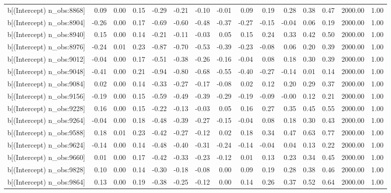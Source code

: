 \begin{table}[ht]
\begin{tabular}{rrrrrrrrrrrrrrr}
  b[(Intercept) n\_obs:8868] & 0.09 & 0.00 & 0.15 & -0.29 & -0.21 & -0.10 & -0.01 & 0.09 & 0.19 & 0.28 & 0.38 & 0.47 & 2000.00 & 1.00 \\ 
  b[(Intercept) n\_obs:8904] & -0.26 & 0.00 & 0.17 & -0.69 & -0.60 & -0.48 & -0.37 & -0.27 & -0.15 & -0.04 & 0.06 & 0.19 & 2000.00 & 1.00 \\ 
  b[(Intercept) n\_obs:8940] & 0.15 & 0.00 & 0.14 & -0.21 & -0.11 & -0.03 & 0.05 & 0.15 & 0.24 & 0.33 & 0.42 & 0.50 & 2000.00 & 1.00 \\ 
  b[(Intercept) n\_obs:8976] & -0.24 & 0.01 & 0.23 & -0.87 & -0.70 & -0.53 & -0.39 & -0.23 & -0.08 & 0.06 & 0.20 & 0.39 & 2000.00 & 1.00 \\ 
  b[(Intercept) n\_obs:9012] & -0.04 & 0.00 & 0.17 & -0.51 & -0.38 & -0.26 & -0.16 & -0.04 & 0.08 & 0.18 & 0.30 & 0.39 & 2000.00 & 1.00 \\ 
  b[(Intercept) n\_obs:9048] & -0.41 & 0.00 & 0.21 & -0.94 & -0.80 & -0.68 & -0.55 & -0.40 & -0.27 & -0.14 & 0.01 & 0.14 & 2000.00 & 1.00 \\ 
  b[(Intercept) n\_obs:9084] & 0.02 & 0.00 & 0.14 & -0.33 & -0.27 & -0.17 & -0.08 & 0.02 & 0.12 & 0.20 & 0.29 & 0.37 & 2000.00 & 1.00 \\ 
  b[(Intercept) n\_obs:9156] & -0.19 & 0.00 & 0.15 & -0.59 & -0.49 & -0.39 & -0.29 & -0.19 & -0.09 & -0.00 & 0.12 & 0.21 & 2000.00 & 1.00 \\ 
  b[(Intercept) n\_obs:9228] & 0.16 & 0.00 & 0.15 & -0.22 & -0.13 & -0.03 & 0.05 & 0.16 & 0.27 & 0.35 & 0.45 & 0.55 & 2000.00 & 1.00 \\ 
  b[(Intercept) n\_obs:9264] & -0.04 & 0.00 & 0.18 & -0.48 & -0.39 & -0.27 & -0.15 & -0.04 & 0.08 & 0.18 & 0.30 & 0.43 & 2000.00 & 1.00 \\ 
  b[(Intercept) n\_obs:9588] & 0.18 & 0.01 & 0.23 & -0.42 & -0.27 & -0.12 & 0.02 & 0.18 & 0.34 & 0.47 & 0.63 & 0.77 & 2000.00 & 1.00 \\ 
  b[(Intercept) n\_obs:9624] & -0.14 & 0.00 & 0.14 & -0.48 & -0.40 & -0.31 & -0.24 & -0.14 & -0.04 & 0.04 & 0.13 & 0.22 & 2000.00 & 1.00 \\ 
  b[(Intercept) n\_obs:9660] & 0.01 & 0.00 & 0.17 & -0.42 & -0.33 & -0.23 & -0.12 & 0.01 & 0.13 & 0.23 & 0.34 & 0.45 & 2000.00 & 1.00 \\ 
  b[(Intercept) n\_obs:9828] & 0.10 & 0.00 & 0.14 & -0.30 & -0.18 & -0.08 & 0.00 & 0.09 & 0.19 & 0.28 & 0.38 & 0.46 & 2000.00 & 1.00 \\ 
  b[(Intercept) n\_obs:9864] & 0.13 & 0.00 & 0.19 & -0.38 & -0.25 & -0.12 & 0.00 & 0.14 & 0.26 & 0.37 & 0.52 & 0.64 & 2000.00 & 1.00 \\ 

\end{tabular}
\end{table}
